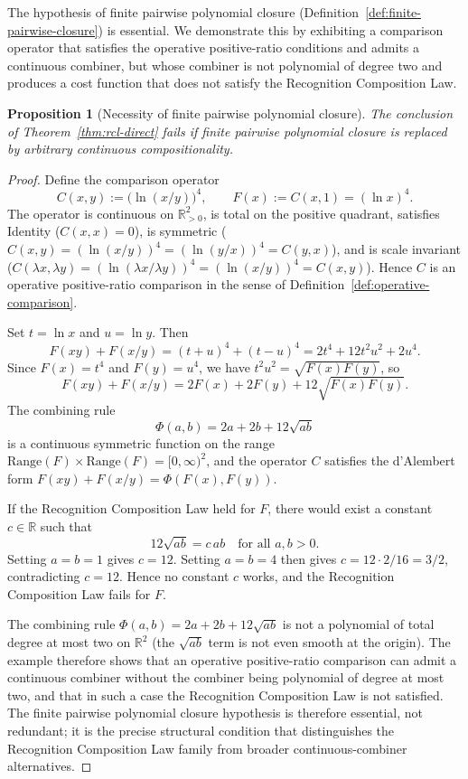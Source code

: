 \documentclass[11pt,a4paper]{article}
\newtheorem{proposition}[theorem]{Proposition}
\theoremstyle{definition}
\theoremstyle{remark}
\begin{document}
The hypothesis of finite pairwise polynomial closure
(Definition~\ref{def:finite-pairwise-closure}) is essential. We
demonstrate this by exhibiting a comparison operator that satisfies the
operative positive-ratio conditions and admits a continuous combiner,
but whose combiner is not polynomial of degree two and produces a cost
function that does not satisfy the Recognition Composition Law.

\begin{proposition}[Necessity of finite pairwise polynomial closure]
\label{prop:finite-closure-necessary}
The conclusion of Theorem~\ref{thm:rcl-direct} fails if finite pairwise
polynomial closure is replaced by arbitrary continuous compositionality.
\end{proposition}

\begin{proof}
Define the comparison operator
\[
C(x, y) := \bigl(\ln(x/y)\bigr)^4,
\qquad F(x) := C(x, 1) = (\ln x)^4.
\]
The operator is continuous on $\mathbb{R}_{>0}^2$, is total on the
positive quadrant, satisfies Identity ($C(x, x) = 0$), is symmetric
($C(x, y) = (\ln(x/y))^4 = (\ln(y/x))^4 = C(y, x)$), and is scale
invariant ($C(\lambda x, \lambda y) = (\ln(\lambda x / \lambda y))^4 =
(\ln(x/y))^4 = C(x, y)$). Hence $C$ is an operative positive-ratio
comparison in the sense of Definition~\ref{def:operative-comparison}.

Set $t = \ln x$ and $u = \ln y$. Then
\[
F(xy) + F(x/y) = (t + u)^4 + (t - u)^4 = 2 t^4 + 12 t^2 u^2 + 2 u^4.
\]
Since $F(x) = t^4$ and $F(y) = u^4$, we have $t^2 u^2 = \sqrt{F(x) F(y)}$,
so
\[
F(xy) + F(x/y) = 2 F(x) + 2 F(y) + 12 \sqrt{F(x) F(y)}.
\]
The combining rule
\[
\Phi(a, b) = 2 a + 2 b + 12 \sqrt{a b}
\]
is a continuous symmetric function on the range
$\mathrm{Range}(F) \times \mathrm{Range}(F) = [0, \infty)^2$, and the
operator $C$ satisfies the d'Alembert form $F(xy) + F(x/y) = \Phi(F(x), F(y))$.

If the Recognition Composition Law held for $F$, there would exist a
constant $c \in \mathbb{R}$ such that
\[
12 \sqrt{a b} = c \, a b
\quad \text{for all } a, b > 0.
\]
Setting $a = b = 1$ gives $c = 12$. Setting $a = b = 4$ then gives
$c = 12 \cdot 2 / 16 = 3 / 2$, contradicting $c = 12$. Hence no constant
$c$ works, and the Recognition Composition Law fails for $F$.

The combining rule $\Phi(a, b) = 2 a + 2 b + 12 \sqrt{a b}$ is not a
polynomial of total degree at most two on $\mathbb{R}^2$ (the $\sqrt{a b}$
term is not even smooth at the origin). The example therefore shows
that an operative positive-ratio comparison can admit a continuous
combiner without the combiner being polynomial of degree at most two,
and that in such a case the Recognition Composition Law is not
satisfied. The finite pairwise polynomial closure hypothesis is
therefore essential, not redundant; it is the precise structural
condition that distinguishes the Recognition Composition Law family
from broader continuous-combiner alternatives.
\end{proof}
\end{document}
